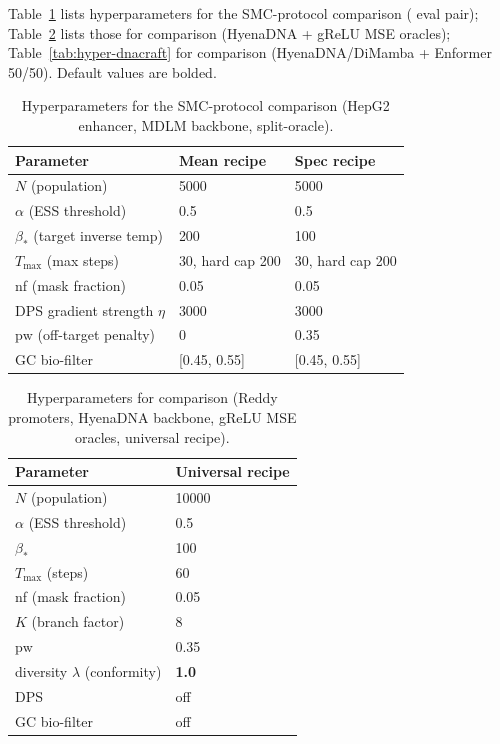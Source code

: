 Table~\ref{tab:hyper-rerd} lists hyperparameters for the SMC-protocol comparison (\drakes{} eval pair); Table~\ref{tab:hyper-ctrldna} lists those for \ctrldna{} comparison (HyenaDNA + gReLU MSE oracles); Table~\ref{tab:hyper-dnacraft} for \dnacraft{} comparison (HyenaDNA/DiMamba + Enformer 50/50). Default values are bolded.

\begin{table}[h]
\caption{Hyperparameters for the SMC-protocol comparison (HepG2 enhancer, MDLM backbone, \drakes{} split-oracle).}
\label{tab:hyper-rerd}
\centering
\small
\begin{tabular}{lll}
\toprule
Parameter & Mean recipe & Spec recipe \\
\midrule
$N$ (population) & 5000 & 5000 \\
$\alpha$ (ESS threshold) & 0.5 & 0.5 \\
$\beta_*$ (target inverse temp) & 200 & 100 \\
$T_{\max}$ (max steps) & 30, hard cap 200 & 30, hard cap 200 \\
nf (mask fraction) & 0.05 & 0.05 \\
DPS gradient strength $\eta$ & 3000 & 3000 \\
$\mathrm{pw}$ (off-target penalty) & 0 & 0.35 \\
GC bio-filter & [0.45, 0.55] & [0.45, 0.55] \\
\bottomrule
\end{tabular}
\end{table}

\begin{table}[h]
\caption{Hyperparameters for \ctrldna{} comparison (Reddy promoters, HyenaDNA backbone, gReLU MSE oracles, universal recipe).}
\label{tab:hyper-ctrldna}
\centering
\small
\begin{tabular}{ll}
\toprule
Parameter & Universal recipe \\
\midrule
$N$ (population) & 10000 \\
$\alpha$ (ESS threshold) & 0.5 \\
$\beta_*$ & 100 \\
$T_{\max}$ (steps) & 60 \\
nf (mask fraction) & 0.05 \\
$K$ (branch factor) & 8 \\
$\mathrm{pw}$ & 0.35 \\
diversity $\lambda$ (conformity) & \textbf{1.0} \\
DPS & off \\
GC bio-filter & off \\
\bottomrule
\end{tabular}
\end{table}

